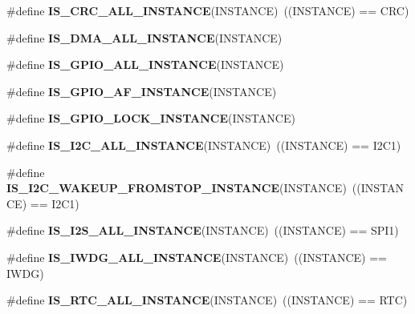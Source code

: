 \begin{DoxyCompactItemize}
\mbox{\label{group___exported__macro_gaa514941a7f02f65eb27450c05e4e8dd1}} 
\#define {\bfseries I\+S\+\_\+\+C\+R\+C\+\_\+\+A\+L\+L\+\_\+\+I\+N\+S\+T\+A\+N\+CE}(I\+N\+S\+T\+A\+N\+CE)~((I\+N\+S\+T\+A\+N\+CE) == C\+RC)
\item 
\#define {\bfseries I\+S\+\_\+\+D\+M\+A\+\_\+\+A\+L\+L\+\_\+\+I\+N\+S\+T\+A\+N\+CE}(I\+N\+S\+T\+A\+N\+CE)
\item 
\#define {\bfseries I\+S\+\_\+\+G\+P\+I\+O\+\_\+\+A\+L\+L\+\_\+\+I\+N\+S\+T\+A\+N\+CE}(I\+N\+S\+T\+A\+N\+CE)
\item 
\#define {\bfseries I\+S\+\_\+\+G\+P\+I\+O\+\_\+\+A\+F\+\_\+\+I\+N\+S\+T\+A\+N\+CE}(I\+N\+S\+T\+A\+N\+CE)
\item 
\#define {\bfseries I\+S\+\_\+\+G\+P\+I\+O\+\_\+\+L\+O\+C\+K\+\_\+\+I\+N\+S\+T\+A\+N\+CE}(I\+N\+S\+T\+A\+N\+CE)
\item 
\mbox{\label{group___exported__macro_gacdf0149a4e8c41a6814c13613c38a6b2}} 
\#define {\bfseries I\+S\+\_\+\+I2\+C\+\_\+\+A\+L\+L\+\_\+\+I\+N\+S\+T\+A\+N\+CE}(I\+N\+S\+T\+A\+N\+CE)~((I\+N\+S\+T\+A\+N\+CE) == I2\+C1)
\item 
\mbox{\label{group___exported__macro_gadf692bda16bac3264bccff7f59ddaab9}} 
\#define {\bfseries I\+S\+\_\+\+I2\+C\+\_\+\+W\+A\+K\+E\+U\+P\+\_\+\+F\+R\+O\+M\+S\+T\+O\+P\+\_\+\+I\+N\+S\+T\+A\+N\+CE}(I\+N\+S\+T\+A\+N\+CE)~((I\+N\+S\+T\+A\+N\+CE) == I2\+C1)
\item 
\mbox{\label{group___exported__macro_ga0b35685911e3c7a38ee89e5cdc5a82fa}} 
\#define {\bfseries I\+S\+\_\+\+I2\+S\+\_\+\+A\+L\+L\+\_\+\+I\+N\+S\+T\+A\+N\+CE}(I\+N\+S\+T\+A\+N\+CE)~((I\+N\+S\+T\+A\+N\+CE) == S\+P\+I1)
\item 
\mbox{\label{group___exported__macro_gad9ec4c52f0572ee67d043e006f1d5e39}} 
\#define {\bfseries I\+S\+\_\+\+I\+W\+D\+G\+\_\+\+A\+L\+L\+\_\+\+I\+N\+S\+T\+A\+N\+CE}(I\+N\+S\+T\+A\+N\+CE)~((I\+N\+S\+T\+A\+N\+CE) == I\+W\+DG)
\item 
\mbox{\label{group___exported__macro_gab4230e8bd4d88adc4250f041d67375ce}} 
\#define {\bfseries I\+S\+\_\+\+R\+T\+C\+\_\+\+A\+L\+L\+\_\+\+I\+N\+S\+T\+A\+N\+CE}(I\+N\+S\+T\+A\+N\+CE)~((I\+N\+S\+T\+A\+N\+CE) == R\+TC)

\end{DoxyCompactItemize}
